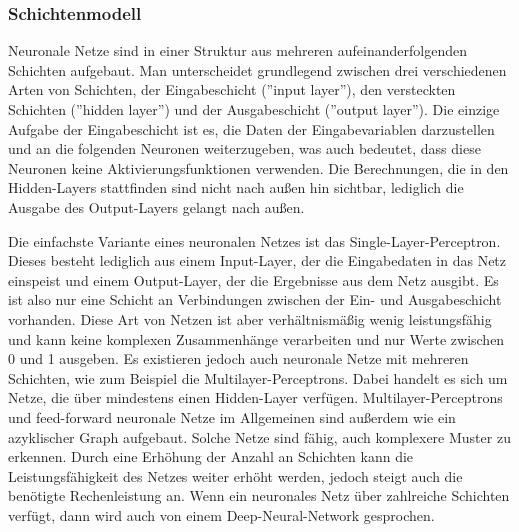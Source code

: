 \subsubsection{Schichtenmodell}\label{subsec:neuronen:schichtenmodell}
Neuronale Netze sind in einer Struktur aus mehreren aufeinanderfolgenden Schichten aufgebaut.
Man unterscheidet grundlegend zwischen drei verschiedenen Arten von Schichten, der Eingabeschicht (''input layer''), den versteckten Schichten (''hidden layer'') und der Ausgabeschicht (''output layer'').
Die einzige Aufgabe der Eingabeschicht ist es, die Daten der Eingabevariablen darzustellen und an die folgenden Neuronen weiterzugeben, was auch bedeutet, dass diese Neuronen keine Aktivierungsfunktionen verwenden.
Die Berechnungen, die in den Hidden-Layers stattfinden sind nicht nach außen hin sichtbar, lediglich die Ausgabe des Output-Layers gelangt nach außen.

\bigbreak\noindent
Die einfachste Variante eines neuronalen Netzes ist das Single-Layer-Perceptron. Dieses besteht lediglich aus einem Input-Layer, der die Eingabedaten in das Netz einspeist und einem Output-Layer, der die Ergebnisse aus dem Netz ausgibt.
Es ist also nur eine Schicht an Verbindungen zwischen der Ein- und Ausgabeschicht vorhanden.
Diese Art von Netzen ist aber verhältnismäßig wenig leistungsfähig und kann keine komplexen Zusammenhänge verarbeiten und nur Werte zwischen 0 und 1 ausgeben.
Es existieren jedoch auch neuronale Netze mit mehreren Schichten, wie zum Beispiel die Multilayer-Perceptrons. Dabei handelt es sich um Netze, die über mindestens einen Hidden-Layer verfügen.
Multilayer-Perceptrons und feed-forward neuronale Netze im Allgemeinen sind außerdem wie ein azyklischer Graph aufgebaut.
Solche Netze sind fähig, auch komplexere Muster zu erkennen.
Durch eine Erhöhung der Anzahl an Schichten kann die Leistungsfähigkeit des Netzes weiter erhöht werden, jedoch steigt auch die benötigte Rechenleistung an.
Wenn ein neuronales Netz über zahlreiche Schichten verfügt, dann wird auch von einem Deep-Neural-Network gesprochen.